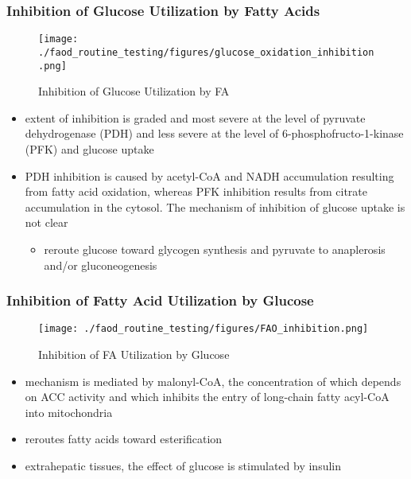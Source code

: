 \documentclass{scrartcl}
\begin{document}
\subsubsection{Inhibition of Glucose Utilization by Fatty Acids}
\label{sec:orgfdc7baf}
\begin{figure}[htbp]
\centering
\texttt{[image: ./faod\_routine\_testing/figures/glucose\_oxidation\_inhibition.png]}
\caption{\label{fig:org55d6bf4}
Inhibition of Glucose Utilization by FA}
\end{figure}

\begin{itemize}
\item extent of inhibition is graded and most severe at the level of
pyruvate dehydrogenase (PDH) and less severe at the level of
6-phosphofructo-1-kinase (PFK) and glucose uptake
\item PDH inhibition is caused by acetyl-CoA and NADH accumulation
resulting from fatty acid oxidation, whereas PFK inhibition results
from citrate accumulation in the cytosol. The mechanism of
inhibition of glucose uptake is not clear
\begin{itemize}
\item reroute glucose toward glycogen synthesis and pyruvate
to anaplerosis and/or gluconeogenesis
\end{itemize}
\end{itemize}

\subsubsection{Inhibition of Fatty Acid Utilization by Glucose}
\label{sec:org30dbc34}

\begin{figure}[htbp]
\centering
\texttt{[image: ./faod\_routine\_testing/figures/FAO\_inhibition.png]}
\caption{\label{fig:org07f1a7c}
Inhibition of FA Utilization by Glucose}
\end{figure}

\begin{itemize}
\item mechanism is mediated by malonyl-CoA, the concentration of which
depends on ACC activity and which inhibits the entry of long-chain
fatty acyl-CoA into mitochondria
\item reroutes fatty acids toward esterification
\item extrahepatic tissues, the effect of glucose is stimulated by
insulin
\end{itemize}
\end{document}
